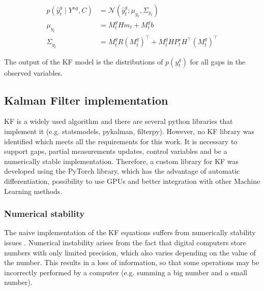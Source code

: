 \documentclass{article}
\newcommand{\norm}[3]{\mathcal{N}\left(#1; #2, #3\right)} %
\let\Oldsubsection\subsection
\renewcommand{\subsection}{\FloatBarrier\Oldsubsection}
\begin{document}
\begin{equation}
\begin{aligned}\label{eq:filter_predictions}
    p(\hat{y}^g_t \mid Y^{ng}, C) &= \norm{\hat{y}^g_t}{\mu_{y_t}}{\Sigma_{y_t}} \\
    \mu_{y_t} &= M^g_tHm_t + M^g_tb \\
    \Sigma_{y_t} &= M^g_tR(M^g_t)^\top + M^g_tHP^s_tH^\top (M^g_t)^\top
\end{aligned}
\end{equation}

The output of the KF model is the distributions of $p(y^g_t)$ for all gaps in the observed variables.

\subsection{Kalman Filter implementation}


KF is a widely used algorithm and there are several python libraries that implement it (e.g. \textsf{statsmodels}, \textsf{pykalman}, \textsf{filterpy}). However, no  KF library was identified which meets all the requirements for this work. It is necessary to support gaps, partial measurements updates, control variables and be a numerically stable implementation.
Therefore, a custom library for KF was developed using the \textsf{PyTorch} library, which has the advantage of automatic differentiation, possibility to use GPUs and better integration with other Machine Learning methods.

\subsubsection{Numerical stability}

The naive implementation of the KF equations suffers from numerically stability issues \cite{mohinder_s_grewal_kalman_2001, dan_simon_optimal_2006}. %
Numerical instability arises from the fact that digital computers store numbers with only limited precision, which also varies depending on the value of the number. This results in a loss of information, so that some operations may be incorrectly performed by a  computer (e.g. summing a big number and a small number).
\end{document}
